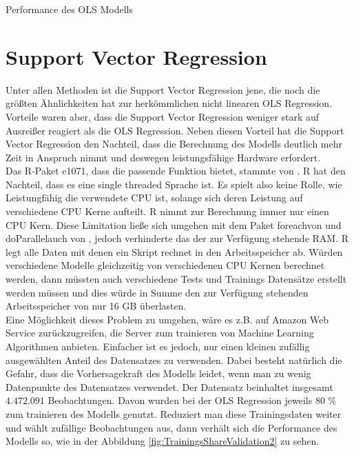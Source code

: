 \documentclass[a4paper,12pt]{thesis}
\begin{document}
\begin{table}
	\caption{Performance des OLS Modells}
	\label{tbl:OLS1}
\end{table}

\section{Support Vector Regression}

Unter allen Methoden ist die Support Vector Regression jene, die noch die größten Ähnlichkeiten hat zur herkömmlichen nicht linearen OLS Regression. Vorteile waren aber, dass die Support Vector Regression weniger stark auf Ausreißer reagiert als die OLS Regression. Neben diesen Vorteil hat die Support Vector Regression den Nachteil, dass die Berechnung des Modells deutlich mehr Zeit in Anspruch nimmt und deswegen leistungsfähige Hardware erfordert.\\
Das R-Paket \glqq e1071\grqq, dass die passende Funktion bietet, stammte von \cite{e10712021}. R hat den Nachteil, dass es eine single threaded Sprache ist. Es spielt also keine Rolle, wie Leistungfähig die verwendete CPU ist, solange sich deren Leistung auf verschiedene CPU Kerne aufteilt. R nimmt zur Berechnung immer nur einen CPU Kern. Diese Limitation ließe sich umgehen mit dem Paket \glqq foreach\grqq von \cite{foreach} und \glqq doParallel\grqq auch von \cite{doParallel}, jedoch verhinderte das der zur Verfügung stehende RAM. R legt alle Daten mit denen ein Skript rechnet in den Arbeitsspeicher ab. Würden verschiedene Modelle gleichzeitig von verschiedenen CPU Kernen berechnet werden, dann müssten auch verschiedene Tests und Trainings Datensätze erstellt werden müssen und dies würde in Summe den zur Verfügung stehenden Arbeitsspeicher von nur 16 GB überlasten.\\
Eine Möglichkeit dieses Problem zu umgehen, wäre es z.B. auf Amazon Web Service zurückzugreifen, die Server zum trainieren von Machine Learning Algorithmen anbieten. Einfacher ist es jedoch, nur einen kleinen zufällig ausgewählten Anteil des Datensatzes zu verwenden. Dabei besteht natürlich die Gefahr, dass die Vorhersagekraft des Modells leidet, wenn man zu wenig Datenpunkte des Datensatzes verwendet. Der Datensatz beinhaltet insgesamt $4.472.091$ Beobachtungen. Davon wurden bei der OLS Regression jeweils 80 \% zum trainieren des Modells genutzt. Reduziert man diese Trainingsdaten weiter und wählt zufällige Beobachtungen aus, dann verhält sich die Performance des Modells so, wie in der Abbildung \ref{fig:TrainingsShareValidation2} zu sehen.
\end{document}
